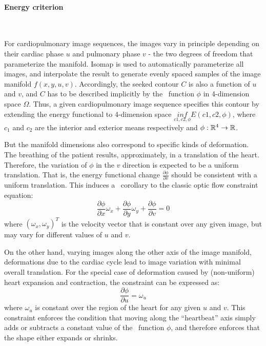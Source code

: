 \paragraph{Energy criterion}
~\par \vspace{0.3cm}
For cardiopulmonary image sequences, the images vary in principle depending on their cardiac phase $u$ and pulmonary phase $v$ - the two degrees of freedom that parameterize the manifold. Isomap is used to automatically parameterize all images, and interpolate the result to generate evenly spaced samples of the image manifold $f(x, y, u, v)$. Accordingly, the seeked contour $C$ is also a function of $u$ and $v$, and $C$ has to be described implicitly by the \ls~function $\phi$ in 4-dimension space $\Omega$. Thus, a given cardiopulmonary image sequence specifies this contour by extending the energy functional  to 4-dimension space $\underset{c1,c2,\phi}{inf}E(c1,c2,\phi)$, where $c_1$ and $c_2$ are the interior and exterior means respectively and $\phi: \mathbb{R}^4 \rightarrow \mathbb{R}$.

But the manifold dimensions also correspond to specific kinds of deformation. The breathing of the patient results, approximately, in a translation of the heart. Therefore, the variation of $\phi$ in the $v$ direction is expected to be a uniform translation. That is, the energy functional change $\frac{\partial \phi}{\partial v}$ should be consistent with a uniform translation. This induces a \ls~corollary to the classic optic flow constraint equation:
\begin{equation}
  \label{eq:ls_OpticalFlow_zhang}
  \frac{\partial \phi}{\partial x}\omega_x + \frac{\partial \phi}{\partial y}\omega_y + \frac{\partial \phi}{\partial v} = 0
\end{equation}
where $(\omega_x, \omega_y)^T$ is the velocity vector that is constant over any given image, but may vary for different values of $u$ and $v$.

On the other hand, varying images along the other axis of the image manifold, deformations due to the cardiac cycle lead to image variation with minimal overall translation. For the special case of deformation caused by (non-uniform) heart expansion and contraction, the constraint can be expressed as:
\begin{equation}
  \label{eq:ls_dphidu_zhang}
  \frac{\partial \phi}{\partial u} = \omega_u
\end{equation}
where $\omega_u$ is constant over the region of the heart for any given $u$ and $v$. This constraint enforces the condition that moving along the ``heartbeat'' axis simply adds or subtracts a constant value of the \ls~function $\phi$, and therefore enforces that the shape either expands or shrinks.

